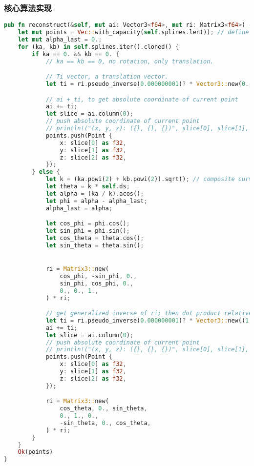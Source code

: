 \subsubsection{核心算法实现}
\begin{lstlisting}[language=Rust, style=boxed]
pub fn reconstruct(&self, mut ai: Vector3<f64>, mut ri: Matrix3<f64>) -> Result<Vec<Point>, &'static str> {
    let mut points = Vec::with_capacity(self.splines.len()); // define points vector and reserve capacity
    let mut alpha_last = 0.;
    for (ka, kb) in self.splines.iter().cloned() {
        if ka == 0. && kb == 0. {
            // ka == kb == 0, no rotation, only translation.

            // Ti vector, a translation vector.
            let ti = ri.pseudo_inverse(0.000000001)? * Vector3::new(0., 0., self.ds);

            // ai + ti, to get absolute coordinate of current point
            ai += ti;
            let slice = ai.column(0);
            // push absolute coordinate of current point
            // println!("(x, y, z): ({}, {}, {})", slice[0], slice[1], slice[2]);
            points.push(Point {
                x: slice[0] as f32,
                y: slice[1] as f32,
                z: slice[2] as f32,
            });
        } else {
            let k = (ka.powi(2) + kb.powi(2)).sqrt(); // composite curvature
            let theta = k * self.ds;
            let alpha = (ka / k).acos();
            let phi = alpha - alpha_last;
            alpha_last = alpha;

            let cos_phi = phi.cos();
            let sin_phi = phi.sin();
            let cos_theta = theta.cos();
            let sin_theta = theta.sin();


            ri = Matrix3::new(
                cos_phi, -sin_phi, 0.,
                sin_phi, cos_phi, 0.,
                0., 0., 1.,
            ) * ri;

            // get generalized inverse of ri; then dot product relative coordinate
            let ti = ri.pseudo_inverse(0.000000001)? * Vector3::new((1. - cos_theta) / k, 0., sin_theta / k);
            ai += ti;
            let slice = ai.column(0);
            // push absolute coordinate of current point
            // println!("(x, y, z): ({}, {}, {})", slice[0], slice[1], slice[2]);
            points.push(Point {
                x: slice[0] as f32,
                y: slice[1] as f32,
                z: slice[2] as f32,
            });

            ri = Matrix3::new(
                cos_theta, 0., sin_theta,
                0., 1., 0.,
                -sin_theta, 0., cos_theta,
            ) * ri;
        }
    }
    Ok(points)
}
\end{lstlisting}


